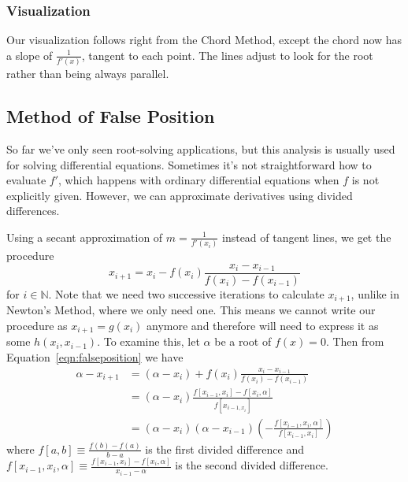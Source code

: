 \documentclass[12pt,letterpaper,DIV=11]{scrartcl}
\theoremstyle{plain}
\theoremstyle{definition}
\theoremstyle{remark}
\begin{document}
\subsubsection{Visualization}
Our visualization follows right from the Chord Method, except the chord now has a slope of $\frac{1}{f'(x)}$, tangent to each point.
The lines adjust to look for the root rather than being always parallel.


\subsection{Method of False Position}
So far we've only seen root-solving applications, but this analysis is usually used for solving differential equations.
Sometimes it's not straightforward how to evaluate $f'$, which happens with ordinary differential equations when $f$ is not explicitly given.
However, we can approximate derivatives using divided differences.

Using a secant approximation of $m = \frac{1}{f'(x_i)}$ instead of tangent lines,
we get the procedure \begin{equation}\label{eqn:falseposition}
  x_{i + 1} = x_i - f(x_i) \frac{x_i - x_{i - 1}}{f(x_i) - f(x_{i - 1})}
\end{equation} for $i \in \mathbb{N}$.
Note that we need two successive iterations to calculate $x_{i + 1}$, unlike in Newton's Method, where we only need one.
This means we cannot write our procedure as $x_{i + 1} = g(x_i)$ anymore and therefore will need to express it as some $h(x_i, x_{i - 1})$.
To examine this, let $\alpha$ be a root of $f(x) = 0$.
Then from Equation~\ref{eqn:falseposition} we have \begin{equation}
  \begin{split}\label{eqn:divdiff}
    \alpha - x_{i + 1} &= \left( \alpha - x_i \right) + f(x_i) \frac{x_i - x_{i - 1}}{f(x_i) - f(x_{i - 1})} \\
                       &= \left( \alpha - x_i \right) \frac{f[x_{i - 1}, x_i] - f[x_i, \alpha]}{f[x_{i - 1, x_i}]} \\
                       &= (\alpha - x_i) (\alpha - x_{i - 1}) \left( - \frac{f[x_{i - 1}, x_i, \alpha]}{f[x_{i - 1}, x_i]} \right)
  \end{split}
\end{equation}
where $f[a, b] \equiv \frac{f(b) - f(a)}{b - a}$ is the first divided difference and $f[x_{i - 1}, x_i, \alpha] \equiv \frac{f[x_{i - 1}, x_i] - f[x_i, \alpha]}{x_{i - 1} - \alpha}$ is the second divided difference.
\end{document}
